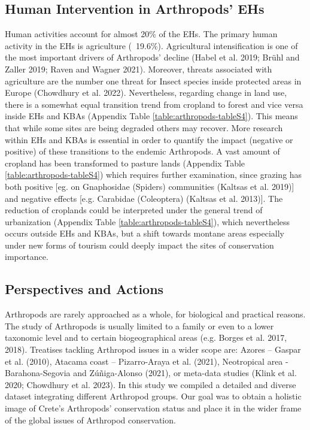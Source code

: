     \subsection{Human Intervention in Arthropods’ EHs}
    \label{subsec:arthropods-human-intervention-ehs}
Human activities account for almost 20\% of the EHs. The primary human activity
in the EHs is agriculture (~19.6\%). Agricultural intensification is one of the
most important drivers of Arthropods’ decline (Habel et al. 2019; Brühl and Zaller 2019; Raven and Wagner 2021).
Moreover, threats associated with agriculture are the number one threat for
Insect species inside protected areas in Europe (Chowdhury et al. 2022).
Nevertheless, regarding change in land use, there is a somewhat equal
transition trend from cropland to forest and vice versa inside EHs and KBAs
(Appendix Table \ref{table:arthropods-tableS4}). This means that while some sites are being
degraded others may recover. More research within EHs and KBAs is essential in
order to quantify the impact (negative or positive) of these transitions to the
endemic Arthropods. A vast amount of cropland has been transformed to pasture
lands (Appendix Table \ref{table:arthropods-tableS4}) which requires further examination,
since grazing has both positive [eg. on Gnaphosidae (Spiders) communities (Kaltsas et al.  2019)]
and negative effects [e.g. Carabidae (Coleoptera) (Kaltsas et al. 2013)].
The reduction of croplands could be interpreted under the general trend of
urbanization (Appendix Table \ref{table:arthropods-tableS4}), which nevertheless occurs
outside EHs and KBAs, but a shift towards montane areas especially under new
forms of tourism could deeply impact the sites of conservation importance.
    
    \subsection{Perspectives and Actions}
    \label{subsec:arthropods-perspectives-actions}

Arthropods are rarely approached as a whole, for biological and practical
reasons. The study of Arthropods is usually limited to a family or even to a
lower taxonomic level and to certain biogeographical areas (e.g. Borges et al. 2017, 2018).
Treatises tackling Arthropod issues in a wider scope are: Azores – Gaspar et al. (2010),
Atacama coast – Pizarro-Araya et al. (2021), Neotropical area - Barahona-Segovia and Zúñiga-Alonso (2021),
or meta-data studies (Klink et al. 2020; Chowdhury et al. 2023). In this study
we compiled a detailed and diverse dataset integrating different Arthropod groups.
Our goal was to obtain a holistic image of Crete’s Arthropods’ conservation
status and place it in the wider frame of the global issues of Arthropod conservation.

